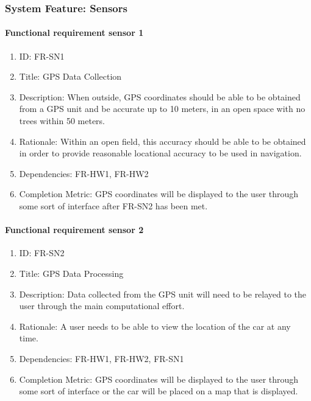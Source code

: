 \documentclass[compsoc,draftclsnofoot,onecolumn,10pt]{IEEEtran}
\begin{document}
\subsubsection{System Feature: Sensors}

	\paragraph{Functional requirement sensor 1}
    		\begin{enumerate}
    			\item ID: FR-SN1
    			\item Title: GPS Data Collection
    			\item Description: When outside, GPS coordinates should be able to be obtained from a GPS unit and be accurate up to 10 meters, in an open space with no trees within 50 meters. 
    			\item Rationale: Within an open field, this accuracy should be able to be obtained in order to provide reasonable locational accuracy to be used in navigation.
    			\item Dependencies: FR-HW1, FR-HW2
			\item Completion Metric: GPS coordinates will be displayed to the user through some sort of interface after FR-SN2 has been met. 
    		\end{enumerate}
		
	\paragraph{Functional requirement sensor 2}
    		\begin{enumerate}
    			\item ID: FR-SN2
    			\item Title: GPS Data Processing
    			\item Description: Data collected from the GPS unit will need to be relayed to the user through the main computational effort. 
    			\item Rationale: A user needs to be able to view the location of the car at any time. 
    			\item Dependencies: FR-HW1, FR-HW2, FR-SN1
			\item Completion Metric: GPS coordinates will be displayed to the user through some sort of interface or the car will be placed on a map that is displayed. 
    		\end{enumerate}
		
\end{document}
